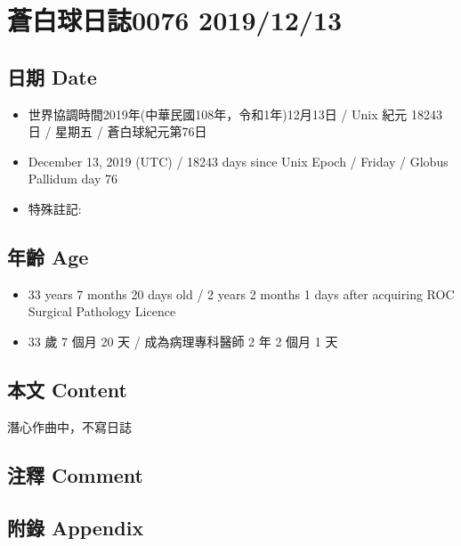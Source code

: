 \documentclass[
]{article}
\providecommand{\tightlist}{%
  \setlength{\itemsep}{0pt}\setlength{\parskip}{0pt}}
\begin{document}
\hypertarget{ux84bcux767dux7403ux65e5ux8a8c0076-20191213}{%
\section{蒼白球日誌0076
2019/12/13}\label{ux84bcux767dux7403ux65e5ux8a8c0076-20191213}}

\hypertarget{ux65e5ux671f-date-12}{%
\subsection{日期 Date}\label{ux65e5ux671f-date-12}}

\begin{itemize}
\tightlist
\item
  世界協調時間2019年(中華民國108年，令和1年)12月13日 / Unix 紀元 18243
  日 / 星期五 / 蒼白球紀元第76日
\item
  December 13, 2019 (UTC) / 18243 days since Unix Epoch / Friday /
  Globus Pallidum day 76
\item
  特殊註記:
\end{itemize}

\hypertarget{ux5e74ux9f61-age-12}{%
\subsection{年齡 Age}\label{ux5e74ux9f61-age-12}}

\begin{itemize}
\tightlist
\item
  33 years 7 months 20 days old / 2 years 2 months 1 days after
  acquiring ROC Surgical Pathology Licence
\item
  33 歲 7 個月 20 天 / 成為病理專科醫師 2 年 2 個月 1 天
\end{itemize}

\hypertarget{ux672cux6587-content-12}{%
\subsection{本文 Content}\label{ux672cux6587-content-12}}

潛心作曲中，不寫日誌

\hypertarget{ux6ce8ux91cb-comment-11}{%
\subsection{注釋 Comment}\label{ux6ce8ux91cb-comment-11}}

\hypertarget{ux9644ux9304-appendix-12}{%
\subsection{附錄 Appendix}\label{ux9644ux9304-appendix-12}}
\end{document}
